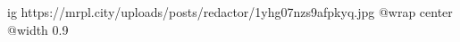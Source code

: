  
 
 
 
 

\ifcmt
  ig https://mrpl.city/uploads/posts/redactor/1yhg07nzs9afpkyq.jpg
  @wrap center
  @width 0.9
\fi

